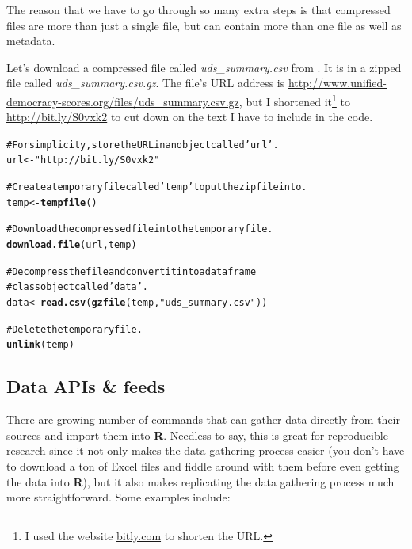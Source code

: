 \documentclass[ChapterTOCs,krantz1]{krantz}\usepackage{graphicx, color}
\makeatletter
\newcommand{\hlfunctioncall}[1]{\textcolor[rgb]{0.501960784313725,0,0.329411764705882}{\textbf{#1}}}%
\newcommand{\hlstring}[1]{\textcolor[rgb]{0.6,0.6,1}{#1}}%
\newcommand{\hlcomment}[1]{\textcolor[rgb]{0.180392156862745,0.6,0.341176470588235}{#1}}%
\newenvironment{kframe}{%
 \def\at@end@of@kframe{}%
 \ifinner\ifhmode%
  \def\at@end@of@kframe{\end{minipage}}%
  \begin{minipage}{\columnwidth}%
 \fi\fi%
 \def\FrameCommand##1{\hskip\@totalleftmargin \hskip-\fboxsep
 \colorbox{shadecolor}{##1}\hskip-\fboxsep
     \hskip-\linewidth \hskip-\@totalleftmargin \hskip\columnwidth}%
 \MakeFramed {\advance\hsize-\width
   \@totalleftmargin\z@ \linewidth\hsize
   \@setminipage}}%
 {\par\unskip\endMakeFramed%
 \at@end@of@kframe}
\newenvironment{knitrout}{}{} %
\makeatother
\begin{document}
The reason that we have to go through so many extra steps is that compressed files are more than just a single file, but can contain more than one file as well as metadata.

Let's download a compressed file called {\emph{uds\_summary.csv}} from \cite{Pemstein2010}. It is in a zipped file called {\emph{uds\_summary.csv.gz}}. The file's URL address is {\url{http://www.unified-democracy-scores.org/files/uds_summary.csv.gz}}, but I shortened it\footnote{I used the website \url{bitly.com} to shorten the URL.} to \url{http://bit.ly/S0vxk2} to cut down on the text I have to include in the code.

\begin{knitrout}
\color{fgcolor}\begin{kframe}
\begin{alltt}
\hlcomment{# For simplicity, store the URL in an object called \hlstring{'url'}.}
url <- \hlstring{"http://bit.ly/S0vxk2"}

\hlcomment{# Create a temporary file called \hlstring{'temp'} to put the zip file into.}
temp <- \hlfunctioncall{tempfile}()

\hlcomment{# Download the compressed file into the temporary file.}
\hlfunctioncall{download.file}(url, temp)

\hlcomment{# Decompress the file and convert it into a dataframe}
\hlcomment{# class object called \hlstring{'data'}.}
data <- \hlfunctioncall{read.csv}(\hlfunctioncall{gzfile}(temp, \hlstring{"uds_summary.csv"}))

\hlcomment{# Delete the temporary file.}
\hlfunctioncall{unlink}(temp)
\end{alltt}
\end{kframe}
\end{knitrout}


\subsection{Data APIs \& feeds}

There are growing number of commands that can gather data directly from
their sources and import them into \textbf{R}. Needless to say, this is
great for reproducible research since it not only makes the data
gathering process easier (you don't have to download a ton of Excel
files and fiddle around with them before even getting the data into
\textbf{R}), but it also makes replicating the data gathering process
much more straightforward. Some examples include:
\end{document}
